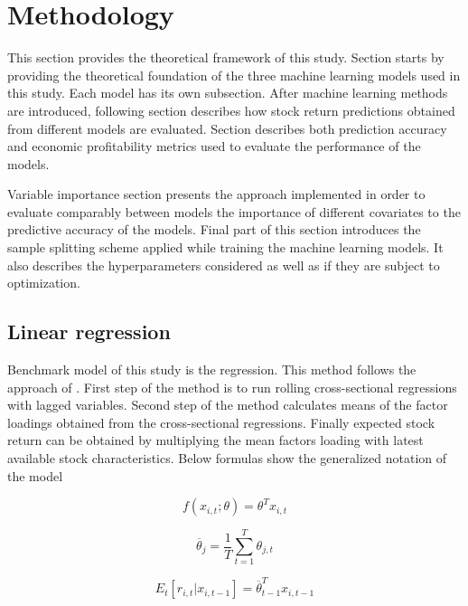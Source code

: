 \documentclass[12pt]{article}
\begin{document}
\section{Methodology} \label{Methodology}

This section provides the theoretical framework of this study. Section starts by providing the theoretical foundation of the three machine learning models used in this study. Each model has its own subsection. After machine learning methods are introduced, following section describes how stock return predictions obtained from different models are evaluated. Section describes both prediction accuracy and economic profitability metrics used to evaluate the performance of the models. \par

Variable importance section presents the approach implemented in order to evaluate comparably between models the importance of different covariates to the predictive accuracy of the models. Final part of this section introduces the sample splitting scheme applied while training the machine learning models. It also describes the hyperparameters considered as well as if they are subject to optimization. \par

\subsection{Linear regression}\label{LinearRegression}
Benchmark model of this study is the \citet{FamaMacBeth1973} regression. This method follows the approach of \citet{Lewellen2015}. First step of the method is to run rolling cross-sectional regressions with lagged variables. Second step of the method calculates means of the factor loadings obtained from the cross-sectional regressions. Finally expected stock return can be obtained by multiplying the mean factors loading with latest available stock characteristics. Below formulas show the generalized notation of the model \par

\begin{equation}
f(x_{i, t}; \theta) = \theta^T x_{i, t}
\end{equation}

\begin{equation}
\overline \theta_j = \frac{1}{T} \sum^{T}_{t=1}\theta_{j, t}
\end{equation}

\begin{equation}
E_t \left[ r_{i, t} | x_{i, t-1} \right] = \overline \theta_{t-1}^T x_{i, t-1}
\end{equation}
\end{document}
